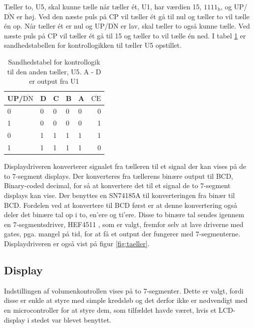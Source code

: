 Tæller to, U5, skal kunne tælle når tæller ét, U1, har værdien 15, $1111_\mathrm{b}$, og UP/$\overline{\mathrm{DN}}$ er høj. Ved den næste puls på CP vil tæller ét gå til nul og tæller to vil tælle én op. Når tæller ét er nul og UP/$\overline{\mathrm{DN}}$ er lav, skal tæller to også kunne tælle. Ved næste puls på CP vil tæller ét gå til 15 og tæller to vil tælle én ned. I tabel \ref{tab:taeller2} er sandhedstabellen for kontrollogikken til tæller U5 opstillet.

\begin{table}[h]
\centering
\begin{tabular}{|l|l|l|l|l||r|}
\hline
UP/$\overline{\mathrm{DN}}$ & D & C & B & A & $\overline{\mathrm{CE}}$ \\ \hline
0 & 0 & 0 & 0 & 0 & 0 \\
1 & 0 & 0 & 0 & 0 & 1 \\
0 & 1 & 1 & 1 & 1 & 1 \\
1 & 1 & 1 & 1 & 1 & 0 \\
\hline
\end{tabular}
\caption{Sandhedstabel for kontrollogik til den anden tæller, U5. A - D er output fra U1}
\label{tab:taeller2}
\end{table}

Displaydriveren konverterer signalet fra tælleren til et signal der kan vises på de to 7-segment displays. Der konverteres fra tællerens binære output til BCD, Binary-coded decimal, for så at konvertere det til et signal de to 7-segment displays kan vise. Der benyttes en SN74185A \cite{sn74185a-datablad} til konverteringen fra binær til BCD. Fordelen ved at konvertere til BCD først er at denne konvertering også deler det binære tal op i to, en'ere og ti'ere. Disse to binære tal sendes igennem en 7-segmentsdriver, HEF4511 \cite{hef4511-datablad}, som er valgt, fremfor selv at lave driverne med gates, pga. mangel på tid, for at få et output der fungerer med 7-segmenterne. Displaydriveren er også vist på figur \ref{fig:taeller}.

\subsection*{Display}
\label{volumenkontrol-design-display}
Indstillingen af volumenkontrollen vises på to 7-segmenter. Dette er valgt, fordi disse er enkle at styre med simple kredsløb og det derfor ikke er nødvendigt med en microcontroller for at styre dem, som tilfældet havde været, hvis et LCD-display i stedet var blevet benyttet.

